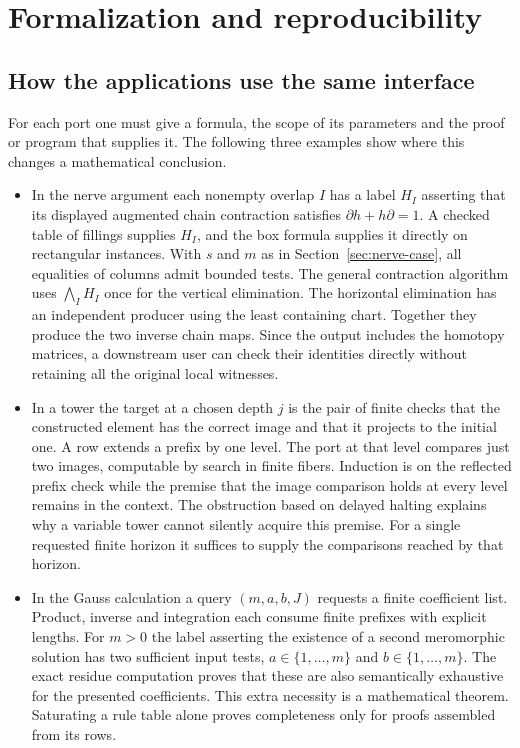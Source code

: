 \section{Formalization and reproducibility}
\label{sec:replay-guide}
\subsection{How the applications use the same interface}
For each port one must give a formula, the scope of its parameters and the proof or program that supplies it. The following three examples show where this changes a mathematical conclusion.
\begin{itemize}
\item In the nerve argument each nonempty overlap $I$ has a label $H_I$ asserting that its displayed augmented chain contraction satisfies $\partial h+h\partial=1$. A checked table of fillings supplies $H_I$, and the box formula supplies it directly on rectangular instances. With $s$ and $m$ as in Section~\ref{sec:nerve-case}, all equalities of columns admit bounded tests. The general contraction algorithm uses $\bigwedge_I H_I$ once for the vertical elimination. The horizontal elimination has an independent producer using the least containing chart. Together they produce the two inverse chain maps. Since the output includes the homotopy matrices, a downstream user can check their identities directly without retaining all the original local witnesses.
\item In a tower the target at a chosen depth $j$ is the pair of finite checks that the constructed element has the correct image and that it projects to the initial one. A row extends a prefix by one level. The port at that level compares just two images, computable by search in finite fibers. Induction is on the reflected prefix check while the premise that the image comparison holds at every level remains in the context. The obstruction based on delayed halting explains why a variable tower cannot silently acquire this premise. For a single requested finite horizon it suffices to supply the comparisons reached by that horizon.
\item In the Gauss calculation a query $(m,a,b,J)$ requests a finite coefficient list. Product, inverse and integration each consume finite prefixes with explicit lengths. For $m>0$ the label asserting the existence of a second meromorphic solution has two sufficient input tests, $a\in\{1,\ldots,m\}$ and $b\in\{1,\ldots,m\}$. The exact residue computation proves that these are also semantically exhaustive for the presented coefficients. This extra necessity is a mathematical theorem. Saturating a rule table alone proves completeness only for proofs assembled from its rows.
\end{itemize}

